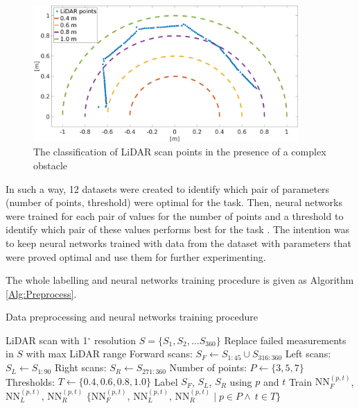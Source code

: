 \begin{figure}
    \centering
    \includegraphics[width=0.9\textwidth]{slike/Fig03_04.png}
    \caption{The classification of LiDAR scan points in the presence of a complex obstacle}
    \label{fig:Threshold}
\end{figure}

In such a way, 12 datasets were created to identify which pair of parameters (number of points, threshold) were optimal for the task. Then, neural networks were trained for each pair of values for the number of points and a threshold to identify which pair of these values performs best for the task \cite{Kruzic2018}. The intention was to keep neural networks trained with data from the dataset with parameters that were proved optimal and use them for further experimenting.

The whole labelling and neural networks training procedure is given as Algorithm \ref{Alg:Preprocess}.

\begin{algorithm}
\caption{Data preprocessing and neural networks training procedure}
\label{Alg:Preprocess}
\begin{algorithmic}
	\renewcommand{\algorithmicrequire}{\textbf{Input:}}
    \renewcommand{\algorithmicensure}{\textbf{Output:}}
    \REQUIRE LiDAR scan with 1$^{\circ}$ resolution $S=\{S_1,S_2,...S_{360}\}$
    \STATE Replace failed measurements in $S$ with max LiDAR range
    \STATE Forward scans: $S_F \gets S_{1:45} \cup S_{316:360}$
    \STATE Left scans: $S_L \gets S_{1:90}$
    \STATE Right scans: $S_R \gets S_{271:360}$
    \STATE Number of points: $P \gets \{3,5,7\}$
    \STATE Thresholds: $T \gets \{0.4, 0.6, 0.8, 1.0\}$
          \STATE Label $S_F$, $S_L$, $S_R$ using $p$ and $t$
          \STATE Train $\mathrm{NN}_F^{(p,t)}$, $\mathrm{NN}_L^{(p,t)}$, $\mathrm{NN}_R^{(p,t)}$
      \ENDFOR
    \ENDFOR
    \ENSURE $\{\mathrm{NN}_F^{(p,t)}$, $\mathrm{NN}_L^{(p,t)}$, $\mathrm{NN}_R^{(p,t)} \mid p \in P \land~t \in T\}$
\end{algorithmic}
\end{algorithm}


